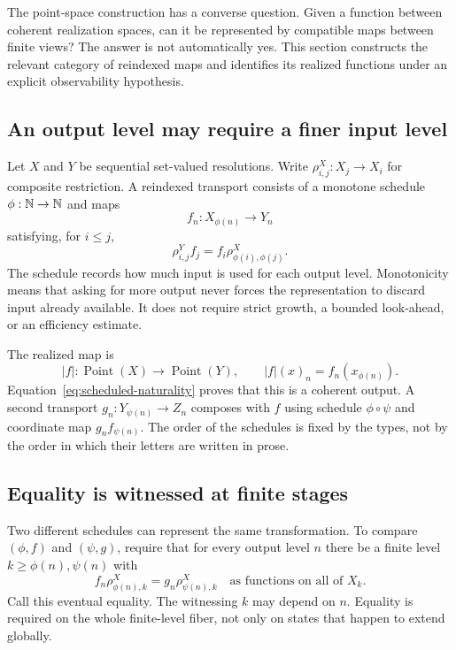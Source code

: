 \label{sec:observation}
The point-space construction has a converse question. Given a function between coherent realization spaces, can it be represented by compatible maps between finite views? The answer is not automatically yes. This section constructs the relevant category of reindexed maps and identifies its realized functions under an explicit observability hypothesis.

\subsection{An output level may require a finer input level}
Let \(X\) and \(Y\) be sequential set-valued resolutions. Write \(\rho^X_{i,j}:X_j\to X_i\) for composite restriction. A reindexed transport consists of a monotone schedule \(\phi:\mathbb N\to\mathbb N\) and maps
\[
 f_n:X_{\phi(n)}\longrightarrow Y_n
\]
satisfying, for \(i\le j\),
\begin{equation}\label{eq:scheduled-naturality}
 \rho^Y_{i,j}f_j=f_i\rho^X_{\phi(i),\phi(j)}.
\end{equation}
The schedule records how much input is used for each output level. Monotonicity means that asking for more output never forces the representation to discard input already available. It does not require strict growth, a bounded look-ahead, or an efficiency estimate.

The realized map is
\[
 |f|:\operatorname{Point}(X)\to\operatorname{Point}(Y),\qquad
 |f|(x)_n=f_n(x_{\phi(n)}).
\]
Equation~\eqref{eq:scheduled-naturality} proves that this is a coherent output. A second transport \(g_n:Y_{\psi(n)}\to Z_n\) composes with \(f\) using schedule \(\phi\circ\psi\) and coordinate map \(g_n f_{\psi(n)}\). The order of the schedules is fixed by the types, not by the order in which their letters are written in prose.

\subsection{Equality is witnessed at finite stages}
Two different schedules can represent the same transformation. To compare \((\phi,f)\) and \((\psi,g)\), require that for every output level \(n\) there be a finite level \(k\ge\phi(n),\psi(n)\) with
\begin{equation}\label{eq:eventual-equality}
 f_n\rho^X_{\phi(n),k}=g_n\rho^X_{\psi(n),k}
 \quad\text{as functions on all of }X_k.
\end{equation}
Call this eventual equality. The witnessing \(k\) may depend on \(n\). Equality is required on the whole finite-level fiber, not only on states that happen to extend globally.

